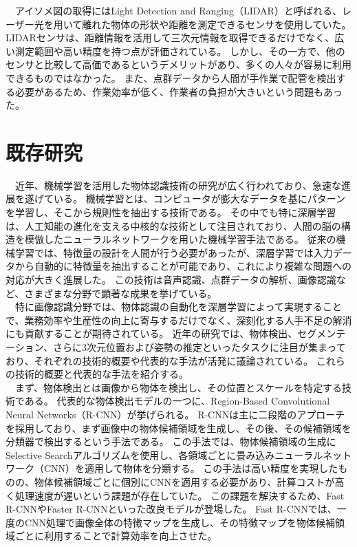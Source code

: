 　アイソメ図の取得にはLight Detection and Ranging（LIDAR）と呼ばれる、レーザー光を用いて離れた物体の形状や距離を測定できるセンサを使用していた。
LIDARセンサは、距離情報を活用して三次元情報を取得できるだけでなく、広い測定範囲や高い精度を持つ点が評価されている。
しかし、その一方で、他のセンサと比較して高価であるというデメリットがあり、多くの人々が容易に利用できるものではなかった。
また、点群データから人間が手作業で配管を検出する必要があるため、作業効率が低く、作業者の負担が大きいという問題もあった。\\

\section{既存研究}
　近年、機械学習を活用した物体認識技術の研究が広く行われており、急速な進展を遂げている。
機械学習とは、コンピュータが膨大なデータを基にパターンを学習し、そこから規則性を抽出する技術である。
その中でも特に深層学習は、人工知能の進化を支える中核的な技術として注目されており、人間の脳の構造を模倣したニューラルネットワークを用いた機械学習手法である。
従来の機械学習では、特徴量の設計を人間が行う必要があったが、深層学習では入力データから自動的に特徴量を抽出することが可能であり、これにより複雑な問題への対応が大きく進展した。
この技術は音声認識、点群データの解析、画像認識など、さまざまな分野で顕著な成果を挙げている。\\
　特に画像認識分野では、物体認識の自動化を深層学習によって実現することで、業務効率や生産性の向上に寄与するだけでなく、深刻化する人手不足の解消にも貢献することが期待されている。
近年の研究では、物体検出、セグメンテーション、さらに3次元位置および姿勢の推定といったタスクに注目が集まっており、それぞれの技術的概要や代表的な手法が活発に議論されている。
これらの技術的概要と代表的な手法を紹介する。\\
　まず、物体検出とは画像から物体を検出し、その位置とスケールを特定する技術である。
代表的な物体検出モデルの一つに、Region-Based Convolutional Neural Networks（R-CNN）が挙げられる。
R-CNNは主に二段階のアプローチを採用しており、まず画像中の物体候補領域を生成し、その後、その候補領域を分類器で検出するという手法である。
この手法では、物体候補領域の生成にSelective Searchアルゴリズムを使用し、各領域ごとに畳み込みニューラルネットワーク（CNN）を適用して物体を分類する。
この手法は高い精度を実現したものの、物体候補領域ごとに個別にCNNを適用する必要があり、計算コストが高く処理速度が遅いという課題が存在していた。
この課題を解決するため、Fast R-CNNやFaster R-CNNといった改良モデルが登場した。
Fast R-CNNでは、一度のCNN処理で画像全体の特徴マップを生成し、その特徴マップを物体候補領域ごとに利用することで計算効率を向上させた。
